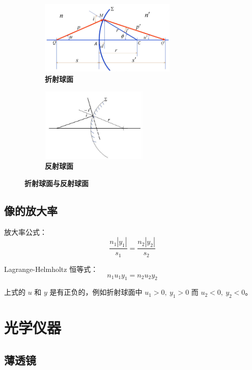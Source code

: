 \documentclass[UTF8]{report}
\theoremstyle{MyLineTheoremStyle} %
\theoremstyle{MyBlockTheoremStyle} %
\theoremstyle{MySubsubsectionStyle} %
\begin{document}
\begin{figure}[H]\centering
\begin{subfigure}[t]{0.45\textwidth}\centering
    \includegraphics[height=100pt]{assets/1,2/image.jpg}
    \caption{\bfseries 折射球面 }
\end{subfigure}\begin{subfigure}[t]{0.4\textwidth}\centering
    \includegraphics[height=100pt]{assets/1,2/image (1).jpg}
    \caption{\bfseries 反射球面 }
\end{subfigure}
\caption{\bfseries 折射球面与反射球面 }
\end{figure}


\subsection{像的放大率}


放大率公式：
\begin{equation}
\frac{n_1 | y_1 |}{s_1} = \frac{n_2 | y_2 |}{s_2}
\end{equation}

Lagrange-Helmholtz 恒等式：
\begin{equation}
n_1u_1y_1 = n_2u_2y_2
\end{equation}

上式的 $u$ 和 $y$ 是有正负的，例如折射球面中 $u_1 > 0,\ y_1 >0$ 而 $u_2 <0,\ y_2 < 0$。







\section{光学仪器}


\subsection{薄透镜}
\end{document}
